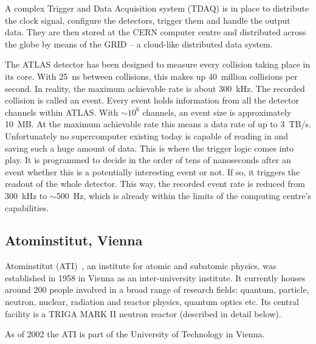 A complex Trigger and Data Acquisition system (TDAQ) is in place to distribute the clock signal, configure the detectors, trigger them and handle the output data. They are then stored at the CERN computer centre and distributed across the globe by means of the GRID -- a cloud-like distributed data system.

The ATLAS detector has been designed to measure every collision taking place in its core. With 25~ns between collisions, this makes up 40~million collisions per second. In reality, the maximum achievable rate is about 300~kHz. The recorded collision is called an event. Every event holds information from all the detector channels within ATLAS. With $\sim$$10^6$ channels, an event size is approximately 10~MB. At the maximum achievable rate this means a data rate of up to 3~TB/s. Unfortunately no supercomputer existing today is capable of reading in and saving such a huge amount of data. This is where the trigger logic comes into play. It is programmed to decide in the order of tens of nanoseconds after an event whether this is a potentially interesting event or not. If so, it triggers the readout of the whole detector. This way, the recorded event rate is reduced from 300~kHz to $\sim$500~Hz, which is already within the limits of the computing centre's capabilities.


\subsection{Atominstitut, Vienna}
Atominstitut (ATI)~\cite{AtomInst:00000}, an institute for atomic and subatomic physics, was established in 1958 in Vienna as an inter-university institute. It currently houses around 200 people involved in a broad range of research fields: quantum, particle, neutron, nuclear, radiation and reactor physics, quantum optics etc. Its central facility is a TRIGA MARK II neutron reactor (described in detail below). 

As of 2002 the ATI is part of the University of Technology in Vienna.


